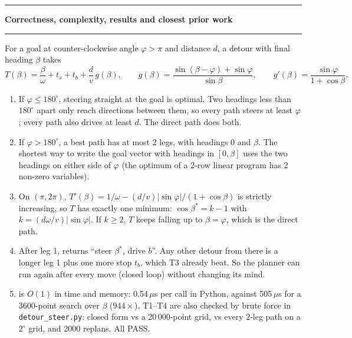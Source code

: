 \documentclass[11pt,a4paper]{article}
\begin{document}
\newpage
\noindent\rule{\linewidth}{1.1pt}\par\vspace{1.4mm}
\noindent\textbf{Correctness, complexity, results and closest prior work}\par\vspace{1.4mm}
\noindent\rule{\linewidth}{0.5pt}\par\vspace{1mm}
{\small
\noindent For a goal at counter-clockwise angle $\varphi > \pi$ and distance $d$, a detour with final heading $\beta$ takes
\[
  T(\beta) = \frac{\beta}{\omega} + t_s + t_b + \frac{d}{v}\,g(\beta), \qquad
  g(\beta) = \frac{\sin(\beta-\varphi) + \sin\varphi}{\sin\beta}, \qquad
  g'(\beta) = \frac{\sin\varphi}{1 + \cos\beta}.
\]
\begin{enumerate}\setlength\itemsep{0.4mm}
\item[\textbf{T1.}] If $\varphi \le 180^\circ$, steering straight at the goal is optimal. Two headings less than
  $180^\circ$ apart only reach directions between them, so every path steers at least $\varphi$; every path
  also drives at least $d$. The direct path does both.
\item[\textbf{T2.}] If $\varphi > 180^\circ$, a best path has at most 2 legs, with headings $0$ and $\beta$.
  The shortest way to write the goal vector with headings in $[0, \beta]$ uses the two headings on either
  side of $\varphi$ (the optimum of a 2-row linear program has 2 non-zero variables).
\item[\textbf{T3.}] On $(\pi, 2\pi)$, $T'(\beta) = 1/\omega - (d/v)\lvert\sin\varphi\rvert/(1+\cos\beta)$ is strictly
  increasing, so $T$ has exactly one minimum: $\cos\beta^\ast = k - 1$ with $k = (d\omega/v)\lvert\sin\varphi\rvert$.
  If $k \ge 2$, $T$ keeps falling up to $\beta = \varphi$, which is the direct path.
\item[\textbf{T4.}] After leg 1,  returns ``steer $\beta^\ast$, drive $b$''. Any other
  detour from there is a longer leg 1 plus one more stop $t_b$, which T3 already beat. So the planner can
  run again after every move (closed loop) without changing its mind.
\item[\textbf{O.}] \FPlan{} is $O(1)$ in time and memory: 0.54\,$\mu$s per call in Python, against 505\,$\mu$s
  for a 3600-point search over $\beta$ ($944\times$). T1--T4 are also checked by brute force in
  \texttt{detour\_steer.py}: closed form vs a 20\,000-point grid, vs every 2-leg path on a
  $2^\circ$ grid, and 2000 replans. All PASS.
\end{enumerate}

}
\end{document}

